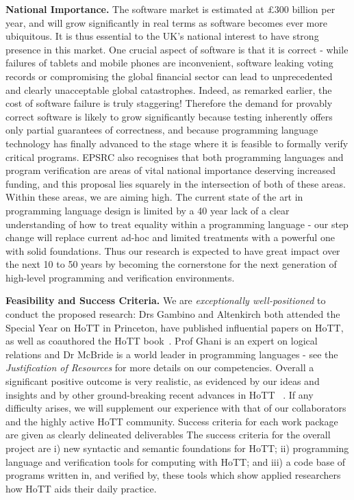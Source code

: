 \documentclass[a4paper,11pt]{article}
\begin{document}
{\bf National Importance.} The software market is estimated at
$\pounds 300$ billion per year, and will grow significantly in
real terms as software becomes ever more ubiquitous. It is thus
essential to the UK's national interest to have strong presence in
this market. One crucial aspect of software is that it is correct - while failures of
tablets and mobile phones are inconvenient,
software leaking voting records or compromising the global financial
sector can lead to unprecedented and clearly unacceptable global
catastrophes. Indeed, as remarked earlier, the cost of software failure is
truly staggering!  Therefore the
demand for provably correct software is likely to grow significantly because testing inherently
offers only partial guarantees of correctness, and because
programming language technology has finally advanced to the stage
where it is feasible to formally verify critical programs.  EPSRC
also recognises that both programming languages and program verification are
areas of vital national importance deserving increased funding, and
this proposal lies squarely in the intersection of both of these areas. Within
these areas, we are aiming high.  The current state of the art in
programming language design is limited by a 40 year lack of a clear
understanding of how to treat equality within a programming language -
our step change will replace current ad-hoc and limited
treatments with a powerful one with solid foundations. Thus our
research is expected to have great impact 
over the next 10 to 50 years by becoming the
cornerstone for the next generation of high-level programming and
verification environments.


{\bf Feasibility and Success Criteria.} 
We are {\em exceptionally
  well-positioned} to conduct the proposed research: Drs Gambino and
Altenkirch both attended the Special Year on HoTT in Princeton, have
published influential papers on HoTT, as well as coauthored the HoTT
book~\cite{hott-book}. Prof Ghani is an expert on logical relations
and Dr McBride is a world leader in programming languages - see the
{\em Justification of Resources} for more details on our
competencies. Overall a significant positive outcome is very
realistic, as evidenced by our ideas and insights 
and by other ground-breaking recent advances in HoTT
~\cite{ShulmanM:uniidh,BezemM:cubsmt}. If any
difficulty arises, we will supplement our experience with that of our
collaborators and the highly active HoTT community. Success criteria
for each work package are given as clearly delineated deliverables 
The success
criteria for the overall project are i) new syntactic and semantic
foundations for HoTT; ii) programming language and verification tools
for computing with HoTT; and iii) a code base of programs written in,
and verified by, these tools which show applied researchers how HoTT
aids their daily practice.
\end{document}
